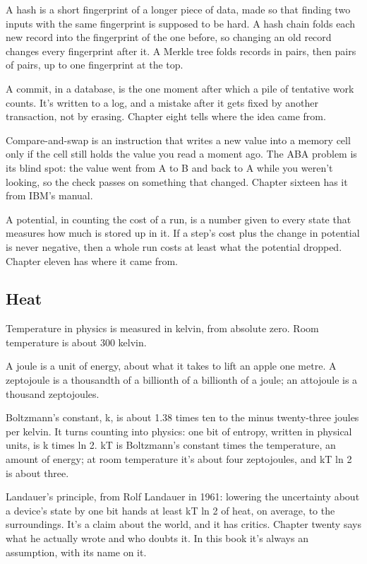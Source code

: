 \documentclass[11pt,twoside]{article}
\theoremstyle{thielethm}
\theoremstyle{thieledef}
\theoremstyle{thieledef}
\theoremstyle{thieledef}
\theoremstyle{thielethm}
\theoremstyle{thieleobs}
\theoremstyle{thielethm}
\begin{document}
A hash is a short fingerprint of a longer piece of data, made so that finding two inputs with the same fingerprint is supposed to be hard. A hash chain folds each new record into the fingerprint of the one before, so changing an old record changes every fingerprint after it. A Merkle tree folds records in pairs, then pairs of pairs, up to one fingerprint at the top.

A commit, in a database, is the one moment after which a pile of tentative work counts. It's written to a log, and a mistake after it gets fixed by another transaction, not by erasing. Chapter eight tells where the idea came from.

Compare-and-swap is an instruction that writes a new value into a memory cell only if the cell still holds the value you read a moment ago. The ABA problem is its blind spot: the value went from A to B and back to A while you weren't looking, so the check passes on something that changed. Chapter sixteen has it from IBM's manual.

A potential, in counting the cost of a run, is a number given to every state that measures how much is stored up in it. If a step's cost plus the change in potential is never negative, then a whole run costs at least what the potential dropped. Chapter eleven has where it came from.

\subsection{Heat}

Temperature in physics is measured in kelvin, from absolute zero. Room temperature is about 300 kelvin.

A joule is a unit of energy, about what it takes to lift an apple one metre. A zeptojoule is a thousandth of a billionth of a billionth of a joule; an attojoule is a thousand zeptojoules.

Boltzmann's constant, k, is about 1.38 times ten to the minus twenty-three joules per kelvin. It turns counting into physics: one bit of entropy, written in physical units, is k times ln 2. kT is Boltzmann's constant times the temperature, an amount of energy; at room temperature it's about four zeptojoules, and kT ln 2 is about three.

Landauer's principle, from Rolf Landauer in 1961: lowering the uncertainty about a device's state by one bit hands at least kT ln 2 of heat, on average, to the surroundings. It's a claim about the world, and it has critics. Chapter twenty says what he actually wrote and who doubts it. In this book it's always an assumption, with its name on it.
\end{document}
